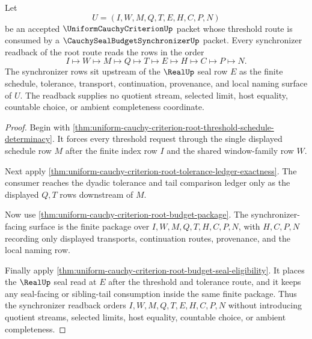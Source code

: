\begin{theorem}
\label{thm:uniform-cauchy-criterion-root-threshold-synchronizer-readback}
Let
$$
U=(I,W,M,Q,T,E,H,C,P,N)
$$
be an accepted $\UniformCauchyCriterionUp$ packet whose threshold route is
consumed by a $\CauchySealBudgetSynchronizerUp$ packet. Every synchronizer
readback of the root route reads the rows in the order
$$
I \longmapsto W \longmapsto M \longmapsto Q \longmapsto T \longmapsto E
\longmapsto H \longmapsto C \longmapsto P \longmapsto N.
$$
The synchronizer rows sit upstream of the $\RealUp$ seal row $E$ as the finite
schedule, tolerance, transport, continuation, provenance, and local naming
surface of $U$. The readback supplies no quotient stream, selected limit, host
equality, countable choice, or ambient completeness coordinate.
\end{theorem}
\begin{proof}
Begin with
\autoref{thm:uniform-cauchy-criterion-root-threshold-schedule-determinacy}.
It forces every threshold request through the single displayed schedule row
$M$ after the finite index row $I$ and the shared window-family row $W$.

Next apply
\autoref{thm:uniform-cauchy-criterion-root-tolerance-ledger-exactness}. The
consumer reaches the dyadic tolerance and tail comparison ledger only as the
displayed $Q,T$ rows downstream of $M$.

Now use \autoref{thm:uniform-cauchy-criterion-root-budget-package}. The
synchronizer-facing surface is the finite package over
$I,W,M,Q,T,H,C,P,N$, with $H,C,P,N$ recording only displayed transports,
continuation routes, provenance, and the local naming row.

Finally apply
\autoref{thm:uniform-cauchy-criterion-root-budget-seal-eligibility}. It places
the $\RealUp$ seal read at $E$ after the threshold and tolerance route, and it
keeps any seal-facing or sibling-tail consumption inside the same finite
package. Thus the synchronizer readback orders $I,W,M,Q,T,E,H,C,P,N$ without
introducing quotient streams, selected limits, host equality, countable choice,
or ambient completeness.
\end{proof}

